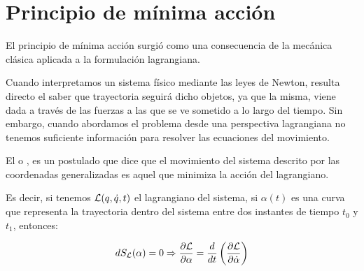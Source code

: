\section{Principio de mínima acción}\label{sec:principio-de-minima-accion}

El principio de mínima acción surgió como una consecuencia de la mecánica clásica aplicada a la formulación lagrangiana.

Cuando interpretamos un sistema físico mediante las leyes de Newton, resulta directo el saber que trayectoria seguirá dicho objetos, ya que la misma, viene dada a través de las fuerzas a las que se ve sometido a lo largo del tiempo.
Sin embargo, cuando abordamos el problema desde una perspectiva lagrangiana no tenemos suficiente información para resolver las ecuaciones del movimiento.

El  o , es un postulado que dice que el movimiento del sistema descrito por las coordenadas generalizadas es aquel que minimiza la acción del lagrangiano.

Es decir, si tenemos $\mathcal{L}(q,\dot{q}, t)$ el lagrangiano del sistema, si $\alpha(t)$ es una curva que representa la trayectoria dentro del sistema entre dos instantes de tiempo $t_0$ y $t_1$, entonces:

\begin{equation*}
	dS_{\mathcal{L}}(\alpha)=0\Rightarrow \frac{\partial \mathcal{L}}{\partial \alpha}=\frac{d}{dt}\left( \frac{\partial \mathcal{L}}{\partial \dot{\alpha}} \right)
\end{equation*}
